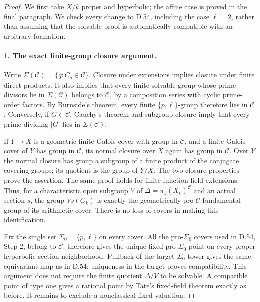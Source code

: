 \begin{proof}
We first take \(X/k\) proper and hyperbolic; the affine case is
proved in the final paragraph.  We check every change to D.54,
including the case \(\ell=2\), rather than assuming that the
solvable proof is automatically compatible with an arbitrary
formation.

\paragraph{1. The exact finite-group closure argument.}

Write $\Sigma(\mathcal C)=\{q:C_q\in\mathcal C\}$.  Closure under
extensions implies closure under finite direct products.  It also
implies that every finite solvable group whose prime divisors lie
in $\Sigma(\mathcal C)$ belongs to $\mathcal C$, by a composition
series with cyclic prime-order factors.  By Burnside's theorem,
every finite $\{p,\ell\}$-group therefore lies in $\mathcal C$.
Conversely, if $G\in\mathcal C$, Cauchy's theorem and subgroup
closure imply that every prime dividing $|G|$ lies in
$\Sigma(\mathcal C)$.

If $Y\to X$ is a geometric finite Galois cover with group in
$\mathcal C$, and a finite Galois cover of $Y$ has group in
$\mathcal C$, its normal closure over $X$ again has group in
$\mathcal C$.  Over $Y$ the normal closure has group a subgroup of
a finite product of the conjugate covering groups; its quotient
is the group of $Y/X$.  The two closure properties prove the
assertion.  The same proof holds for finite function-field
extensions.  Thus, for a characteristic open subgroup $V$ of
$\Delta=\pi_1(X_{\bar k})^{\mathcal C}$ and an actual section $s$,
the group $V s(G_k)$ is exactly the geometrically pro-$\mathcal C$
fundamental group of its arithmetic cover.  There is no loss of
covers in making this identification.

Fix the single set $\Sigma_0=\{p,\ell\}$ on every cover.  All the
pro-$\Sigma_0$ covers used in D.54, Step 2, belong to $\mathcal C$.
\cite[Theorem F(i), Proposition 2.4(iv)]{MT2024}
therefore gives the unique fixed pro-$\Sigma_0$ point on every
proper hyperbolic section neighborhood.  Pullback of the target
$\Sigma_0$ tower gives the same equivariant map as in D.54;
uniqueness in the target proves compatibility.  This argument
does not require the finite quotient $\Delta/V$ to be solvable.
A compatible point of type one gives a rational point by Tate's
fixed-field theorem exactly as before.  It remains to exclude a
nonclassical fixed valuation.


\end{proof}

